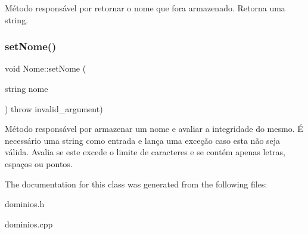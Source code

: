 Método responsável por retornar o nome que fora armazenado. Retorna uma string. \mbox{\label{classNome_ab1507b81047efb89b50b6be0d33c08e5}} 
\subsubsection{\texorpdfstring{set\+Nome()}{setNome()}}
{\footnotesize\ttfamily void Nome\+::set\+Nome (\begin{DoxyParamCaption}\item[{string}]{nome }\end{DoxyParamCaption}) throw  invalid\+\_\+argument) }

Método responsável por armazenar um nome e avaliar a integridade do mesmo. É necessário uma string como entrada e lança uma exceção caso esta não seja válida. Avalia se este excede o limite de caracteres e se contém apenas letras, espaços ou pontos. 

The documentation for this class was generated from the following files\+:\begin{DoxyCompactItemize}
\item 
dominios.\+h\item 
dominios.\+cpp\end{DoxyCompactItemize}
